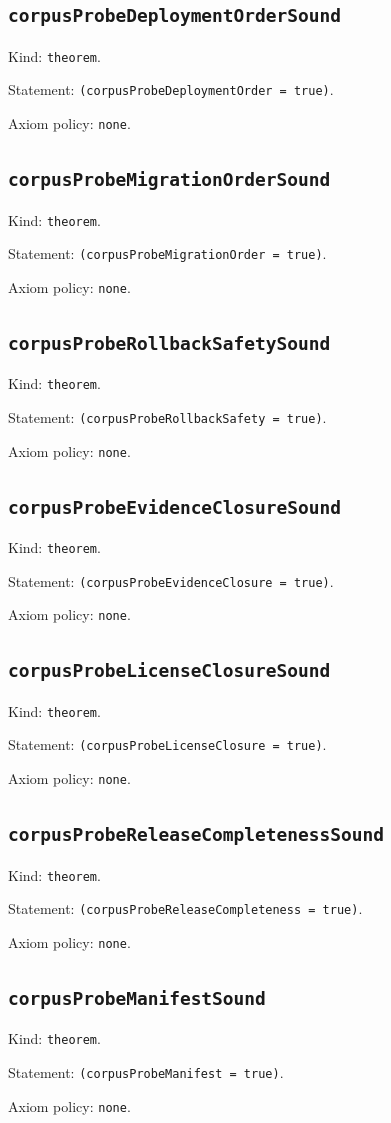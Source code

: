 \documentclass[11pt]{article}
\begin{document}
\subsection*{\texttt{corpusProbeDeploymentOrderSound}}
\noindent Kind: \texttt{theorem}.\par
\noindent Statement: \texttt{(corpusProbeDeploymentOrder = true)}.\par
\noindent Axiom policy: \texttt{none}.\par
\subsection*{\texttt{corpusProbeMigrationOrderSound}}
\noindent Kind: \texttt{theorem}.\par
\noindent Statement: \texttt{(corpusProbeMigrationOrder = true)}.\par
\noindent Axiom policy: \texttt{none}.\par
\subsection*{\texttt{corpusProbeRollbackSafetySound}}
\noindent Kind: \texttt{theorem}.\par
\noindent Statement: \texttt{(corpusProbeRollbackSafety = true)}.\par
\noindent Axiom policy: \texttt{none}.\par
\subsection*{\texttt{corpusProbeEvidenceClosureSound}}
\noindent Kind: \texttt{theorem}.\par
\noindent Statement: \texttt{(corpusProbeEvidenceClosure = true)}.\par
\noindent Axiom policy: \texttt{none}.\par
\subsection*{\texttt{corpusProbeLicenseClosureSound}}
\noindent Kind: \texttt{theorem}.\par
\noindent Statement: \texttt{(corpusProbeLicenseClosure = true)}.\par
\noindent Axiom policy: \texttt{none}.\par
\subsection*{\texttt{corpusProbeReleaseCompletenessSound}}
\noindent Kind: \texttt{theorem}.\par
\noindent Statement: \texttt{(corpusProbeReleaseCompleteness = true)}.\par
\noindent Axiom policy: \texttt{none}.\par
\subsection*{\texttt{corpusProbeManifestSound}}
\noindent Kind: \texttt{theorem}.\par
\noindent Statement: \texttt{(corpusProbeManifest = true)}.\par
\noindent Axiom policy: \texttt{none}.\par
\end{document}
